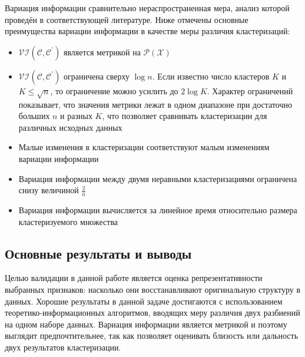 Вариация информации сравнительно нераспространенная мера, анализ которой проведён в соответствующей литературе. Ниже отмечены основные преимущества вариации информации в качестве меры различия кластеризаций:
\begin{itemize}
	\item $\mathcal{VI(C,C^\prime)}$ является метрикой на $\mathcal{P(X)}$
	\item $\mathcal{VI(C,C^\prime)}$ ограничена сверху $\log n$. Если известно число кластеров $K$ и $K \leq \sqrt{n}$, то ограничение можно усилить до $2\log K$. Характер ограничений показывает, что значения метрики лежат в одном диапазоне при достаточно больших $n$ и разных $K$, что позволяет сравнивать кластеризации для различных исходных данных
	\item Малые изменения в кластеризации соответствуют малым изменениям вариации информации
	\item Вариация информации между двумя неравными кластеризациями ограничена снизу величиной $\frac2n$
	\item Вариация информации вычисляется за линейное время относительно размера кластеризуемого множества
\end{itemize}
\subsection{Основные результаты и выводы}
Целью валидации в данной работе является оценка репрезентативности выбранных признаков: насколько они восстанавливают оригинальную структуру в данных. Хорошие результаты в данной задаче достигаются с использованием теоретико-информационных алгоритмов, вводящих меру различия двух разбиений на одном наборе данных. Вариация информации является метрикой и поэтому выглядит предпочтительнее, так как позволяет оценивать близость или дальность двух результатов кластеризации.